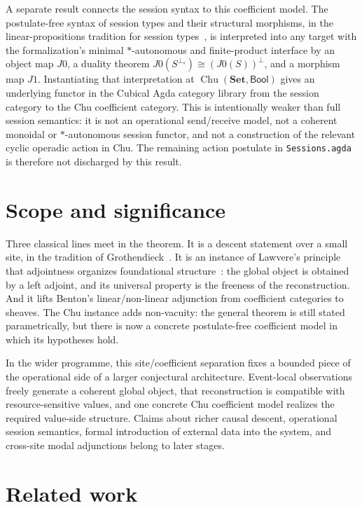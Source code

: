 \documentclass[11pt]{article}
\newcommand{\Set}{\mathbf{Set}}
\newcommand{\Bool}{\mathsf{Bool}}
\newcommand{\Chu}{\operatorname{Chu}}
\begin{document}
A separate result connects the session syntax to this coefficient model. The
postulate-free syntax of session types and their structural morphisms, in the
linear-propositions tradition for session types~\cite{CairesPfenning2010,Wadler2014},
is interpreted into any target with the formalization's minimal $*$-autonomous
and finite-product interface by an object map $J0$, a duality theorem
$J0(S^{\perp_s})\cong (J0(S))^\perp$, and a morphism map $J1$. Instantiating
that interpretation at $\Chu(\Set,\Bool)$ gives an underlying functor in the
Cubical Agda category library from the session category to the Chu coefficient
category. This is intentionally weaker than full session semantics: it is not an
operational send/receive model, not a coherent monoidal or $*$-autonomous
session functor, and not a construction of the relevant cyclic operadic action
in Chu. The remaining action postulate in \texttt{Sessions.agda} is therefore
not discharged by this result.

\section*{Scope and significance}

Three classical lines meet in the theorem. It is a descent statement over a
small site, in the tradition of Grothendieck~\cite{SGA4,MacLaneMoerdijk1992}.
It is an instance of Lawvere's principle that adjointness organizes
foundational structure~\cite{Lawvere1969}: the global object is obtained by a
left adjoint, and its universal property is the freeness of the reconstruction.
And it lifts Benton's linear/non-linear adjunction from coefficient categories
to sheaves. The Chu instance adds non-vacuity: the general theorem is still
stated parametrically, but there is now a concrete postulate-free coefficient
model in which its hypotheses hold.

In the wider programme, this site/coefficient separation fixes a bounded piece
of the operational side of a larger conjectural architecture. Event-local
observations freely generate a coherent global object, that reconstruction is
compatible with resource-sensitive values, and one concrete Chu coefficient
model realizes the required value-side structure. Claims about richer causal
descent, operational session semantics, formal introduction of external data
into the system, and cross-site modal adjunctions belong to later stages.

\section*{Related work}
\end{document}
